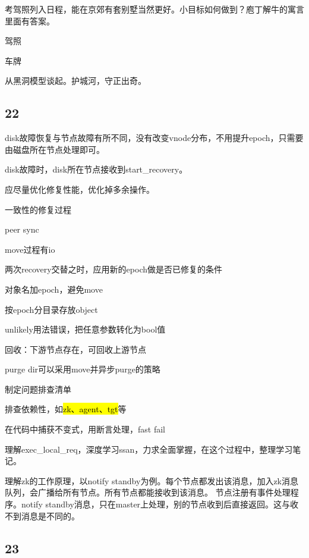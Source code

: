 考驾照列入日程，能在京郊有套别墅当然更好。小目标如何做到？庖丁解牛的寓言里面有答案。
\begin{enumbox}
\item 驾照
\item 车牌
\end{enumbox}

从黑洞模型谈起。护城河，守正出奇。

\subsection{22}

disk故障恢复与节点故障有所不同，没有改变vnode分布，不用提升epoch，只需要由磁盘所在节点处理即可。

disk故障时，disk所在节点接收到start\_recovery。

应尽量优化修复性能，优化掉多余操作。

一致性的修复过程
\begin{enumbox}
\item peer sync
\item move过程有io
\item 两次recovery交替之时，应用新的epoch做是否已修复的条件
\item 对象名加epoch，避免move
\item 按epoch分目录存放object
\item unlikely用法错误，把任意参数转化为bool值
\item 回收：下游节点存在，可回收上游节点
\item purge dir可以采用move并异步purge的策略
\end{enumbox}

制定问题排查清单
\begin{enumbox}
\item 排查依赖性，如\hl{zk、agent、tgt}等
\item 在代码中捕获不变式，用断言处理，fast fail
\end{enumbox}

理解exec\_local\_req，深度学习ssan，力求全面掌握，在这个过程中，整理学习笔记。

理解zk的工作原理，以notify standby为例。每个节点都发出该消息，加入zk消息队列，会广播给所有节点。所有节点都能接收到该消息。
节点注册有事件处理程序。notify standby消息，只在master上处理，别的节点收到后直接返回。这与收不到消息是不同的。

\subsection{23}

